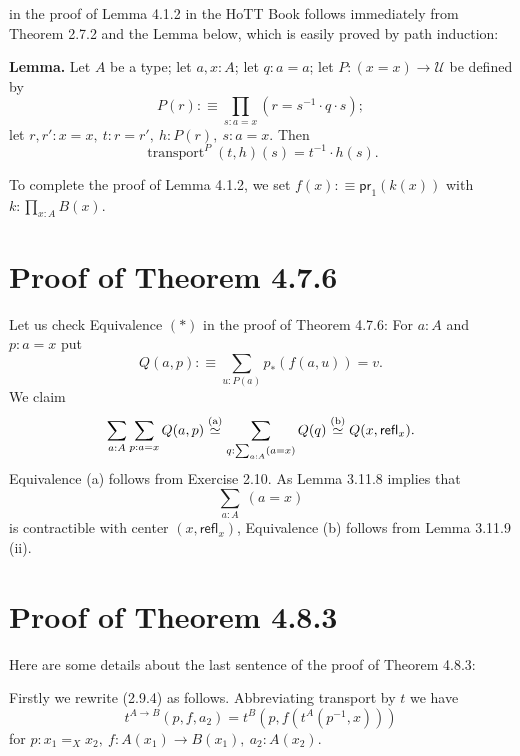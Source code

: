 \documentclass[12pt]{article}
\newcommand{\msf}{\mathsf}
\newcommand{\ee}{\equiv}
\newcommand{\nn}{\noindent}
\newcommand{\oo}{\operatorname}
\newcommand{\refl}{\mathsf{refl}}
\newcommand{\two}{\mathbf2}
\newcommand{\U}{\mathcal U}
\begin{document}
\nn in the proof of Lemma 4.1.2 in the HoTT Book follows immediately from Theorem 2.7.2 and the Lemma below, which is easily proved by path induction:

\nn \textbf{Lemma.} Let $A$ be a type; let $a,x:A$; let $q:a=a$; let $P:(x=x)\to\U$ be defined by 
$$
P(r):\equiv\prod_{s:a=x}(r=s^{-1}\cdot q\cdot s);
$$ 
let $r,r':x=x,\ t:r=r',\ h:P(r),\ s:a=x$. Then 
$$
\oo{transport}^P(t,h)(s)=t^{-1}\cdot h(s).
$$ 

To complete the proof of Lemma 4.1.2, we set $f(x):\ee\msf{pr}_1(k(x))$ with $k:\prod_{x:A}B(x)$.





\section{Proof of Theorem 4.7.6}

Let us check Equivalence $(*)$ in the proof of Theorem 4.7.6: For $a:A$ and $p:a=x$ put 
$$
Q(a,p):\equiv\sum_{u:P(a)}p_*(f(a,u))=v.
$$ 
We claim 
$$
\sum_{a:A}\sum_{p:a=x}Q(a,p)\overset{(\text a)}{\simeq}
\sum_{q:\sum_{a:A}(a=x)}Q(q)\overset{(\text b)}{\simeq}
Q(x,\refl_x).
$$
Equivalence (a) follows from Exercise 2.10. As Lemma 3.11.8 implies that $$\sum_{a:A}\ (a=x)$$ is contractible with center $(x,\refl_x)$, Equivalence (b) follows from Lemma 3.11.9 (ii). 


\section{Proof of Theorem 4.8.3}

Here are some details about the last sentence of the proof of Theorem 4.8.3:

Firstly we rewrite (2.9.4) as follows. Abbreviating transport by $t$ we have 
\begin{equation}\label{2.9.4}
t^{A\to B}(p,f,a_2)=t^B(p,f(t^A(p^{-1},x)))
\end{equation}
for $p:x_1=_Xx_2,\ f:A(x_1)\to B(x_1),\ a_2:A(x_2)$. 
\end{document}
